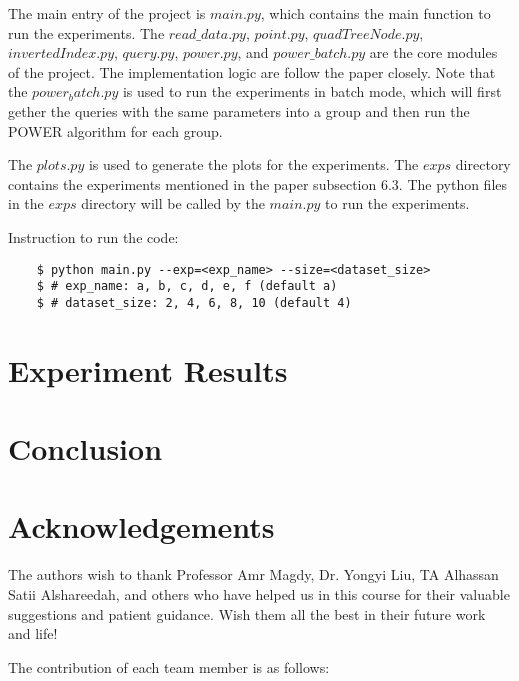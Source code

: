 \documentclass[]{IEEEphot}
\begin{document}
The main entry of the project is $main.py$, which contains the main function to run the experiments. The $read\_data.py$, $point.py$, $quadTreeNode.py$, $invertedIndex.py$, $query.py$, $power.py$, and $power\_batch.py$ are the core modules of the project. The implementation logic are follow the paper closely. Note that the $power_batch.py$ is used to run the experiments in batch mode, which will first gether the queries with the same parameters into a group and then run the POWER algorithm for each group.

The $plots.py$ is used to generate the plots for the experiments. The $exps$ directory contains the experiments mentioned in the paper subsection 6.3. The python files in the $exps$ directory will be called by the $main.py$ to run the experiments.

Instruction to run the code:

\begin{lstlisting}
    $ python main.py --exp=<exp_name> --size=<dataset_size>
    $ # exp_name: a, b, c, d, e, f (default a)
    $ # dataset_size: 2, 4, 6, 8, 10 (default 4)
\end{lstlisting}

\section{Experiment Results}









\section{Conclusion}









\newpage

\section*{Acknowledgements}
The authors wish to thank Professor Amr Magdy, Dr. Yongyi Liu, TA Alhassan Satii Alshareedah, and others who have helped us in this course for their valuable suggestions and patient guidance. Wish them all the best in their future work and life!

The contribution of each team member is as follows:
\end{document}
